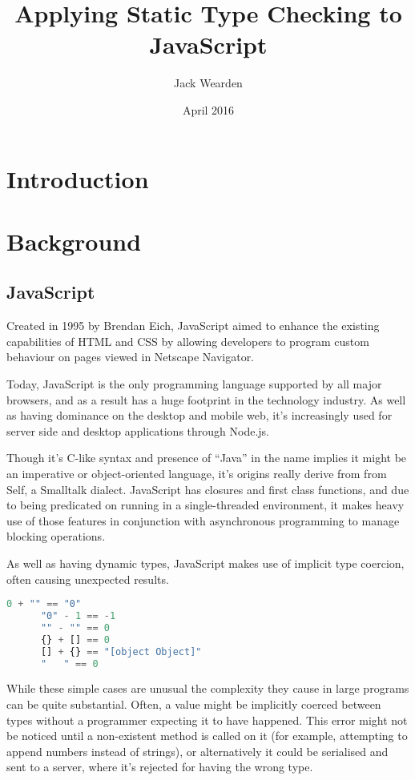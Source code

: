 \documentclass[british, twoside]{bhamthesis}
\title{Applying Static Type Checking to JavaScript}
\author{Jack Wearden}
\date{April 2016}  %
\theoremstyle{definition}
\begin{document}
\maketitle

\begin{abstract}
\end{abstract}

\tableofcontents

\chapter{Introduction}

\chapter{Background}

  \section{JavaScript}
    Created in 1995 by Brendan Eich, JavaScript aimed to enhance the existing capabilities of HTML and CSS by allowing developers to program custom behaviour on pages viewed in Netscape Navigator.

    Today, JavaScript is the only programming language supported by all major browsers, and as a result has a huge footprint in the technology industry. As well as having dominance on the desktop and mobile web, it's increasingly used for server side and desktop applications through Node.js.

    Though it’s C-like syntax and presence of “Java” in the name implies it might be an imperative or object-oriented language, it’s origins really derive from from Self, a Smalltalk dialect. JavaScript has closures and first class functions, and due to being predicated on running in a single-threaded environment, it makes heavy use of those features in conjunction with asynchronous programming to manage blocking operations.

    As well as having dynamic types, JavaScript makes use of implicit type coercion, often causing unexpected results.

    \begin{lstlisting}[language=JavaScript]
      0 + "" == "0"
      "0" - 1 == -1
      "" - "" == 0
      {} + [] == 0
      [] + {} == "[object Object]"
      "   " == 0
    \end{lstlisting}

    While these simple cases are unusual the complexity they cause in large programs can be quite substantial. Often, a value might be implicitly coerced between types without a programmer expecting it to have happened. This error might not be noticed until a non-existent method is called on it (for example, attempting to append numbers instead of strings), or alternatively it could be serialised and sent to a server, where it's rejected for having the wrong type.
\end{document}
